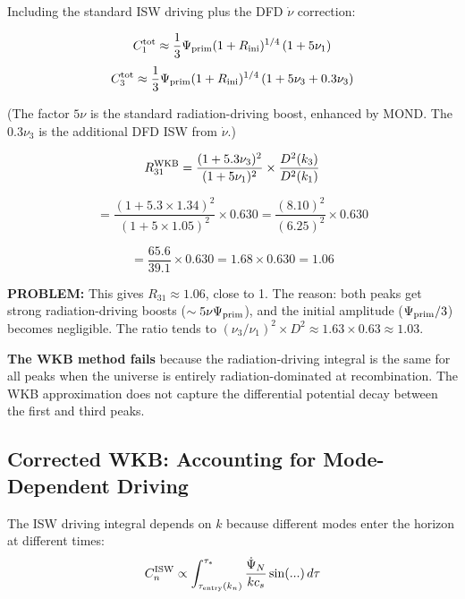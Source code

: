 \documentclass[11pt,a4paper]{article}
\begin{document}
Including the standard ISW driving plus the DFD $\dot{\nu}$ correction:

\begin{equation}
C_1^{\rm tot} \approx \frac{1}{3}\Psi_{\rm prim}(1+R_{\rm ini})^{1/4}\left(1 + 5\nu_1\right)
\end{equation}
\begin{equation}
C_3^{\rm tot} \approx \frac{1}{3}\Psi_{\rm prim}(1+R_{\rm ini})^{1/4}\left(1 + 5\nu_3 + 0.3\nu_3\right)
\end{equation}

(The factor $5\nu$ is the standard radiation-driving boost, enhanced by MOND. The $0.3\nu_3$ is the additional DFD ISW from $\dot{\nu}$.)

\begin{equation}
R_{31}^{\rm WKB} = \frac{(1 + 5.3\nu_3)^2}{(1 + 5\nu_1)^2} \times \frac{D^2(k_3)}{D^2(k_1)}
\end{equation}

\begin{equation}
= \frac{(1 + 5.3\times 1.34)^2}{(1 + 5\times 1.05)^2} \times 0.630 = \frac{(8.10)^2}{(6.25)^2} \times 0.630
\end{equation}

\begin{equation}
= \frac{65.6}{39.1} \times 0.630 = 1.68 \times 0.630 = 1.06
\end{equation}

\textbf{PROBLEM:} This gives $R_{31} \approx 1.06$, close to 1. The reason: both peaks get strong radiation-driving boosts ($\sim 5\nu\Psi_{\rm prim}$), and the initial amplitude ($\Psi_{\rm prim}/3$) becomes negligible. The ratio tends to $(\nu_3/\nu_1)^2 \times D^2 \approx 1.63 \times 0.63 \approx 1.03$.

\textbf{The WKB method fails} because the radiation-driving integral is the same for all peaks when the universe is entirely radiation-dominated at recombination. The WKB approximation does not capture the differential potential decay between the first and third peaks.

\subsection{Corrected WKB: Accounting for Mode-Dependent Driving}

The ISW driving integral depends on $k$ because different modes enter the horizon at different times:
\begin{equation}
C_n^{\rm ISW} \propto \int_{\tau_{\rm entry}(k_n)}^{\tau_*}\frac{\dot{\Psi}_N}{kc_s}\sin(...)\,d\tau
\end{equation}
\end{document}
